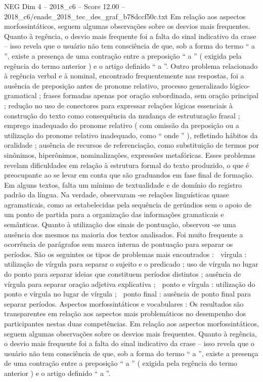 \begin{textsample}{NEG Dim 4 – 2018\_c6 – Score 12.00 – 2018\_c6/enade\_2018\_tec\_des\_graf\_b78dccf50c.txt}
Em relação aos aspectos morfossintáticos, seguem algumas observações sobre os desvios mais frequentes.
Quanto à regência, o desvio mais frequente foi a falta do sinal indicativo da crase – isso revela que o usuário não tem consciência de que, sob a forma do termo “ a ”, existe a presença de uma contração entre a preposição “ a ” ( exigida pela regência do termo anterior ) e o artigo definido “ a ”.
Outro problema relacionado à regência verbal e à nominal, encontrado frequentemente nas respostas, foi a ausência de preposição antes de pronome relativo, processo generalizado lógico-gramatical ; frases formadas apenas por oração subordinada, sem oração principal ; redução no uso de conectores para expressar relações lógicas essenciais à construção do texto como consequência da mudança de estruturação frasal ; emprego inadequado do pronome relativo ( com omissão da preposição ou a utilização do pronome relativo inadequado, como “ onde ” ), refletindo hábitos da oralidade ; ausência de recursos de referenciação, como substituição de termos por sinônimos, hiperônimos, nominalizações, expressões metafóricas.
Esses problemas revelam dificuldades em relação à estrutura formal do texto produzido, o que é preocupante ao se levar em conta que são graduandos em fase final de formação.
Em alguns textos, falta um mínimo de textualidade e de domínio do registro padrão da língua.
Na verdade, observaram -se relações linguísticas quase agramaticais, como as estabelecidas pela sequência de gerúndios sem o apoio de um ponto de partida para a organização das informações gramaticais e semânticas.
Quanto à utilização dos sinais de pontuação, observou -se uma ausência dos mesmos na maioria dos textos analisados.
Foi muito frequente a ocorrência de parágrafos sem marca interna de pontuação para separar os períodos.
São os seguintes os tipos de problemas mais encontrados :  vírgula : utilização de vírgula para separar o sujeito e o predicado ; uso de vírgula no lugar do ponto para separar ideias que constituem períodos distintos ; ausência de vírgula para separar oração adjetiva explicativa ;  ponto e vírgula : utilização do ponto e vírgula no lugar de vírgula ;  ponto final : ausência de ponto final para separar períodos.
Aspectos morfossintáticos e vocabulares : Os resultados são transparentes em relação aos aspectos mais problemáticos no desempenho dos participantes nestas duas competências.
Em relação aos aspectos morfossintáticos, seguem algumas observações sobre os desvios mais frequentes.
Quanto à regência, o desvio mais frequente foi a falta do sinal indicativo da crase – isso revela que o usuário não tem consciência de que, sob a forma do termo “ a ”, existe a presença de uma contração entre a preposição “ a ” ( exigida pela regência do termo anterior ) e o artigo definido “ a ”.

\end{textsample}
